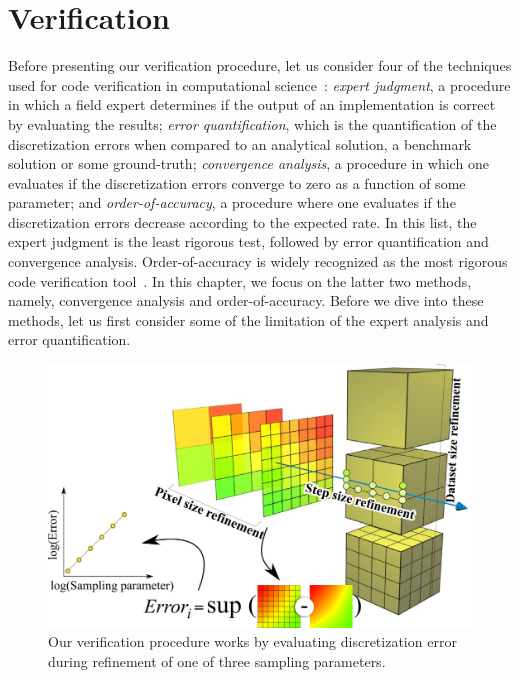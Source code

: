 \section{Verification}
\label{sec:verification}

Before presenting our verification procedure, let us consider four of
the techniques used for code verification in computational
science~\cite{Roy2005}: \emph{expert judgment}, a procedure in which a
field expert determines if the output of an implementation is correct
by evaluating the results; \emph{error quantification}, which is the
quantification of the discretization errors when compared to an
analytical solution, a benchmark solution or some ground-truth;
\emph{convergence analysis}, a procedure in which one evaluates if the
discretization errors converge to zero as a function of some
parameter; and \emph{order-of-accuracy}, a procedure where one
evaluates if the discretization errors decrease according to the
expected rate. In this list, the expert judgment is the least rigorous
test, followed by error quantification and convergence analysis. 
Order-of-accuracy is widely recognized as the most rigorous code
verification tool~\cite{babuska04, KnuppSalari02, roach98,
  Roy2005}. In this chapter, we focus on the latter two methods, namely,
convergence analysis and order-of-accuracy. Before we dive into these
methods, let us first consider some of the limitation of the expert
analysis and error quantification.
\begin{figure}[t]
\centering
\includegraphics[width=0.8\linewidth]{chapter5/figures/refinement.png}
\caption{\label{fig:verification-procedure} Our verification procedure
  works by evaluating discretization error during refinement
  of one of three sampling parameters.%
  }
\end{figure}


